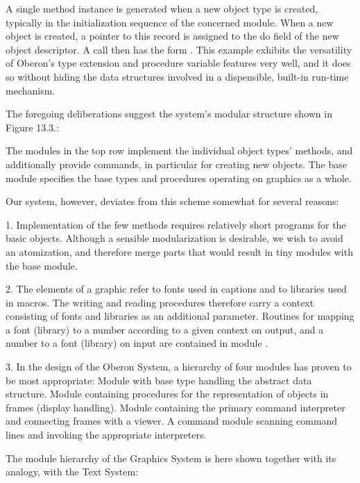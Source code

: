 A single method instance is generated when a new object type is created, typically in the initialization sequence of the concerned module. When a new object is created, a pointer to this record is assigned to the do field of the new object descriptor. A call then has the form . This example exhibits the versatility of Oberon's type extension and procedure variable features very well, and it does so without hiding the data structures involved in a dispensible, built-in run-time mechanism.

The foregoing deliberations suggest the system's modular structure shown in Figure 13.3.:


The modules in the top row implement the individual object types' methods, and additionally provide commands, in particular  for creating new objects. The base module specifies the base types and procedures operating on graphics as a whole.

Our system, however, deviates from this scheme somewhat for several reasons:

\item{1.} Implementation of the few methods requires relatively short programs for the basic objects. Although a sensible modularization is desirable, we wish to avoid an atomization, and therefore merge parts that would result in tiny modules with the base module.
\item{2.} The elements of a graphic refer to fonts used in captions and to libraries used in macros. The writing and reading procedures therefore carry a context consisting of fonts and libraries as an additional parameter. Routines for mapping a font (library) to a number according to a given context on output, and a number to a font (library) on input are contained in module .
\item{3.} In the design of the Oberon System, a hierarchy of four modules has proven to be most appropriate:
 Module with base type handling the abstract data structure.
 Module containing procedures for the representation of objects in frames (display handling).
 Module containing the primary command interpreter and connecting frames with a viewer.
 A command module scanning command lines and invoking the appropriate interpreters.

The module hierarchy of the Graphics System is here shown together with its analogy, with the Text System:

